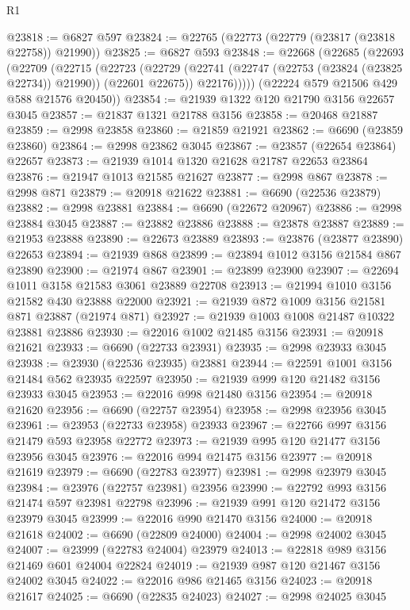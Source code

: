 \begin{lexlean}{R1}
\begin{coremodule}
@23818 := @6827 @597
@23824 := @22765 (@22773 (@22779 (@23817 (@23818 @22758)) @21990))
@23825 := @6827 @593
@23848 := @22668
    (@22685
      (@22693
        (@22709
          (@22715
            (@22723
              (@22729
                (@22741 (@22747 (@22753 (@23824 (@23825 @22734)) @21990)) (@22601 @22675))
                @22176)))))
      (@22224 @579 @21506 @429 @588 @21576 @20450))
@23854 := @21939 @1322 @120 @21790 @3156 @22657 @3045
@23857 := @21837 @1321 @21788 @3156
@23858 := @20468 @21887
@23859 := @2998 @23858
@23860 := @21859 @21921
@23862 := @6690 (@23859 @23860)
@23864 := @2998 @23862 @3045
@23867 := @23857 (@22654 @23864) @22657
@23873 := @21939 @1014 @1320 @21628 @21787 @22653 @23864
@23876 := @21947 @1013 @21585 @21627
@23877 := @2998 @867
@23878 := @2998 @871
@23879 := @20918 @21622
@23881 := @6690 (@22536 @23879)
@23882 := @2998 @23881
@23884 := @6690 (@22672 @20967)
@23886 := @2998 @23884 @3045
@23887 := @23882 @23886
@23888 := @23878 @23887
@23889 := @21953 @23888
@23890 := @22673 @23889
@23893 := @23876 (@23877 @23890) @22653
@23894 := @21939 @868
@23899 := @23894 @1012 @3156 @21584 @867 @23890
@23900 := @21974 @867
@23901 := @23899 @23900
@23907 := @22694 @1011 @3158 @21583 @3061 @23889 @22708
@23913 := @21994 @1010 @3156 @21582 @430 @23888 @22000
@23921 := @21939 @872 @1009 @3156 @21581 @871 @23887 (@21974 @871)
@23927 := @21939 @1003 @1008 @21487 @10322 @23881 @23886
@23930 := @22016 @1002 @21485 @3156
@23931 := @20918 @21621
@23933 := @6690 (@22733 @23931)
@23935 := @2998 @23933 @3045
@23938 := @23930 (@22536 @23935) @23881
@23944 := @22591 @1001 @3156 @21484 @562 @23935 @22597
@23950 := @21939 @999 @120 @21482 @3156 @23933 @3045
@23953 := @22016 @998 @21480 @3156
@23954 := @20918 @21620
@23956 := @6690 (@22757 @23954)
@23958 := @2998 @23956 @3045
@23961 := @23953 (@22733 @23958) @23933
@23967 := @22766 @997 @3156 @21479 @593 @23958 @22772
@23973 := @21939 @995 @120 @21477 @3156 @23956 @3045
@23976 := @22016 @994 @21475 @3156
@23977 := @20918 @21619
@23979 := @6690 (@22783 @23977)
@23981 := @2998 @23979 @3045
@23984 := @23976 (@22757 @23981) @23956
@23990 := @22792 @993 @3156 @21474 @597 @23981 @22798
@23996 := @21939 @991 @120 @21472 @3156 @23979 @3045
@23999 := @22016 @990 @21470 @3156
@24000 := @20918 @21618
@24002 := @6690 (@22809 @24000)
@24004 := @2998 @24002 @3045
@24007 := @23999 (@22783 @24004) @23979
@24013 := @22818 @989 @3156 @21469 @601 @24004 @22824
@24019 := @21939 @987 @120 @21467 @3156 @24002 @3045
@24022 := @22016 @986 @21465 @3156
@24023 := @20918 @21617
@24025 := @6690 (@22835 @24023)
@24027 := @2998 @24025 @3045

\end{coremodule}
\end{lexlean}

